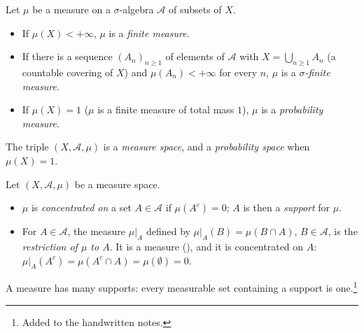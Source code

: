 \begin{definition}\label{def:ms-finite}
Let $\mu$ be a measure on a $\sigma$-algebra $\mathcal A$ of subsets of $X$.
\begin{itemize}
  \item If $\mu(X)<+\infty$, $\mu$ is a \emph{finite measure}.
  \item If there is a sequence $(A_n)_{n\ge1}$ of elements of $\mathcal A$ with
    $X=\bigcup_{n\ge1}A_n$ (a countable covering of $X$) and $\mu(A_n)<+\infty$ for every
    $n$, $\mu$ is a \emph{$\sigma$-finite measure}.
  \item If $\mu(X)=1$ ($\mu$ is a finite measure of total mass $1$), $\mu$ is a
    \emph{probability measure}.
\end{itemize}
The triple $(X,\mathcal A,\mu)$ is a \emph{measure space}, and a \emph{probability space}
when $\mu(X)=1$.
\end{definition}

\begin{definition}\label{def:ms-concentrated}
Let $(X,\mathcal A,\mu)$ be a measure space.
\begin{itemize}
  \item $\mu$ is \emph{concentrated on} a set $A\in\mathcal A$ if $\mu(A^c)=0$; $A$ is then a
    \emph{support} for $\mu$.
  \item For $A\in\mathcal A$, the measure $\mu|_A$ defined by $\mu|_A(B)=\mu(B\cap A)$,
    $B\in\mathcal A$, is the \emph{restriction of $\mu$ to $A$}. It is a measure
    (), and it is concentrated on $A$:
    $\mu|_A(A^c)=\mu(A^c\cap A)=\mu(\emptyset)=0$.
\end{itemize}
\end{definition}

A measure has many supports: every measurable set containing a support is one.\footnote{Added to the handwritten notes.}


